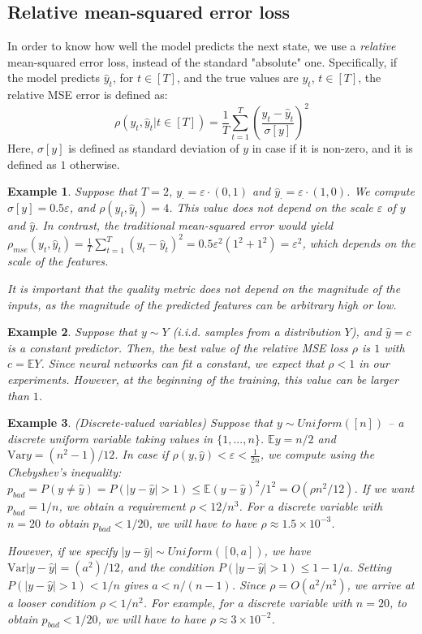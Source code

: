 \documentclass[a4paper,11pt,oneside]{report}
\newtheorem{example}{Example}[section]
\newcommand{\var}{\mbox{Var}}
\begin{document}
\subsection{Relative mean-squared error loss}
In order to know how well the model predicts the next state, we use a {\em relative} mean-squared error loss, instead of the standard "absolute" one. Specifically, if the model predicts $\hat{y}_t$, for $t\in[T]$, and the true values are $y_t$, $t\in[T]$, the relative MSE error is defined as:
\begin{equation}
\label{eq:rel_mse}
\rho(y_t, \hat{y}_t|t\in[T])=\frac{1}{T}\sum\limits_{t=1}^T\left(\frac{y_t-\hat{y}_t}{\sigma[y]}\right)^2
\end{equation}
Here, $\sigma[y]$ is defined as standard deviation of $y$ in case if it is non-zero, and it is defined as $1$ otherwise.

\begin{example}
    Suppose that $T=2$, $y_{\cdot}=\varepsilon\cdot (0,1)$ and $\hat{y}_{\cdot}=\varepsilon\cdot (1, 0)$. We compute $\sigma[y]=0.5\varepsilon$, and $\rho(y_t,\hat{y}_t)=4$. This value does not depend on the scale $\varepsilon$ of $y$ and $\hat{y}$. In contrast, the traditional mean-squared error would yield $\rho_{mse}(y_t,\hat{y}_t)=\frac{1}{T}\sum\limits_{t=1}^T\left(y_t-\hat{y}_t\right)^2=0.5\varepsilon^2(1^2+1^2)=\varepsilon^2$, which depends on the scale of the features.

    It is important that the quality metric does not depend on the magnitude of the inputs, as the magnitude of the predicted features can be arbitrary high or low.
\end{example}

\begin{example}
    Suppose that $y\sim Y$ (i.i.d. samples from a distribution $Y$), and $\hat{y}=c$ is a constant predictor. Then, the best value of the relative MSE loss $\rho$ is $1$ with $c=\mathbb EY$. Since neural networks can fit a constant, we expect that $\rho<1$ in our experiments. However, at the beginning of the training, this value can be larger than $1$.
\end{example}

\begin{example}{(Discrete-valued variables)}
    Suppose that $y\sim Uniform([n])$ -- a discrete uniform variable taking values in $\{1,...,n\}$. $\mathbb Ey=n/2$ and $\var y=(n^2-1)/12$. In case if $\rho(y,\hat{y})<\varepsilon<\frac{1}{2n}$, we compute using the Chebyshev's inequality: $p_{bad}=P(y\neq \hat{y})=P(|y-\hat{y}|>1)\leq \mathbb E(y-\hat{y})^2/1^2=O(\rho n^2/12)$. If we want $p_{bad}=1/n$, we obtain a requirement $\rho<12/n^3$. For a discrete variable with $n=20$ to obtain $p_{bad}<1/20$, we will have to have $\rho\approx1.5\times 10^{-3}$.

    However, if we specify $|y-\hat{y}|\sim Uniform([0, a])$, we have $\var |y-\hat{y}|=(a^2)/12$, and the condition $P(|y-\hat{y}|>1)\leq 1-1/a$. Setting $P(|y-\hat{y}|>1)<1/n$ gives $a<n/(n-1)$. Since $\rho=O(a^2/n^2)$, we arrive at a looser condition $\rho< 1/n^2$. For example, for a discrete variable with $n=20$, to obtain $p_{bad}<1/20$, we will have to have $\rho\approx 3\times 10^{-2}$.
\end{example}
\end{document}
